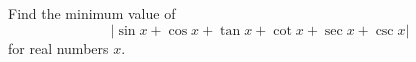 Find the minimum value of
\[
  | \sin x + \cos x + \tan x + \cot x + \sec x + \csc x |
\]
for real numbers  $x$.

